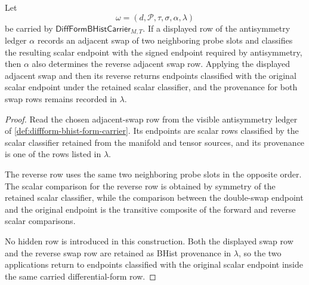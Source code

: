 \begin{theorem}
\label{thm:diffform-adjacent-swap-involution-ledger}
Let
$$
\omega=(d,\mathcal{P},\tau,\sigma,\alpha,\lambda)
$$
be carried by $\mathsf{DiffFormBHistCarrier}_{M,T}$. If a displayed row of the
antisymmetry ledger $\alpha$ records an adjacent swap of two neighboring probe
slots and classifies the resulting scalar endpoint with the signed endpoint
required by antisymmetry, then $\alpha$ also determines the reverse adjacent
swap row. Applying the displayed adjacent swap and then its reverse returns
endpoints classified with the original scalar endpoint under the retained
scalar classifier, and the provenance for both swap rows remains recorded in
$\lambda$.
\end{theorem}
\begin{proof}
Read the chosen adjacent-swap row from the visible antisymmetry ledger of
\autoref{def:diffform-bhist-form-carrier}. Its endpoints are scalar rows
classified by the scalar classifier retained from the manifold and tensor
sources, and its provenance is one of the rows listed in $\lambda$.

The reverse row uses the same two neighboring probe slots in the opposite
order. The scalar comparison for the reverse row is obtained by symmetry of
the retained scalar classifier, while the comparison between the double-swap
endpoint and the original endpoint is the transitive composite of the forward
and reverse scalar comparisons.

No hidden row is introduced in this construction. Both the displayed swap row
and the reverse swap row are retained as BHist provenance in $\lambda$, so the
two applications return to endpoints classified with the original scalar
endpoint inside the same carried differential-form row.
\end{proof}

